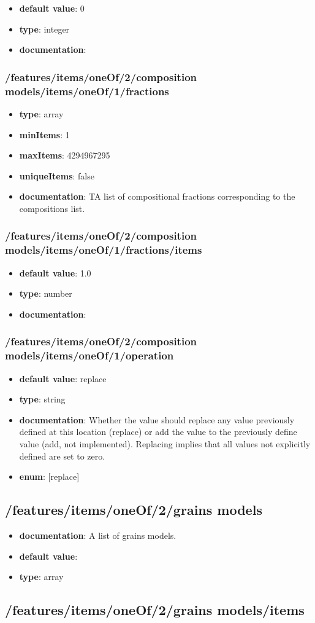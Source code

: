 \begin{itemize}\item {\bf default value}: 0
\item {\bf type}: integer
\item {\bf documentation}: 
\end{itemize}\subsubsection{/features/items/oneOf/2/composition models/items/oneOf/1/fractions}
\begin{itemize}\item {\bf type}: array
\item {\bf minItems}: 1
\item {\bf maxItems}: 4294967295
\item {\bf uniqueItems}: false
\item {\bf documentation}: TA list of compositional fractions corresponding to the compositions list.
\end{itemize}\subsubsection{/features/items/oneOf/2/composition models/items/oneOf/1/fractions/items}
\begin{itemize}\item {\bf default value}: 1.0
\item {\bf type}: number
\item {\bf documentation}: 
\end{itemize}\subsubsection{/features/items/oneOf/2/composition models/items/oneOf/1/operation}
\begin{itemize}\item {\bf default value}: replace
\item {\bf type}: string
\item {\bf documentation}: Whether the value should replace any value previously defined at this location (replace) or add the value to the previously define value (add, not implemented). Replacing implies that all values not explicitly defined are set to zero.
\item {\bf enum}: [replace]\end{itemize}\subsection{/features/items/oneOf/2/grains models}
\begin{itemize}\item {\bf documentation}: A list of grains models.
\item {\bf default value}: 
\item {\bf type}: array
\end{itemize}\subsection{/features/items/oneOf/2/grains models/items}

